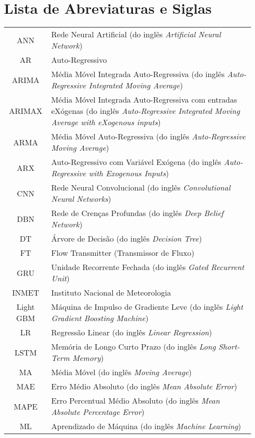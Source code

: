 \newpage
{}
\section*{Lista de Abreviaturas e Siglas}



\begin{tabular}{cp{}}
	ANN & Rede Neural Artificial (do inglês \textit{Artificial Neural Network}) \\
	AR & Auto-Regressivo\\
	ARIMA & Média Móvel Integrada Auto-Regressiva (do inglês \textit{Auto-Regressive Integrated Moving Average}) \\
	ARIMAX & Média Móvel Integrada Auto-Regressiva com entradas eXógenas (do inglês \textit{Auto-Regressive Integrated Moving Average with eXogenous inputs})\\
	ARMA & Média Móvel Auto-Regressiva (do inglês \textit{Auto-Regressive Moving Average}) \\
	ARX & Auto-Regressivo com Variável Exógena (do inglês \textit{Auto-Regressive with Exogenous Inputs})\\
	CNN & Rede Neural Convolucional (do inglês \textit{Convolutional Neural Networks})\\
	DBN & Rede de Crenças Profundas (do inglês \textit{Deep Belief Network}) \\
	DT & Árvore de Decisão (do inglês \textit{Decision Tree}) \\
	FT & Flow Transmitter (Transmissor de Fluxo)\\
	GRU & Unidade Recorrente Fechada (do inglês \textit{Gated Recurrent Unit}) \\
	INMET & Instituto Nacional de Meteorologia\\
	Light GBM & Máquina de Impulso de Gradiente Leve (do inglês \textit{Light Gradient Boosting Machine}) \\
	LR & Regressão Linear (do inglês \textit{Linear Regression})\\
	LSTM & Memória de Longo Curto Prazo (do inglês \textit{Long Short-Term Memory})	\\
	MA & Média Móvel (do inglês \textit{Moving Average})\\
	MAE & Erro Médio Absoluto (do inglês \textit{Mean Absolute Error})\\
	MAPE & Erro Percentual Médio Absoluto (do inglês \textit{Mean Absolute Percentage Error})\\
	ML & Aprendizado de Máquina (do inglês \textit{Machine Learning})	
\end{tabular}

